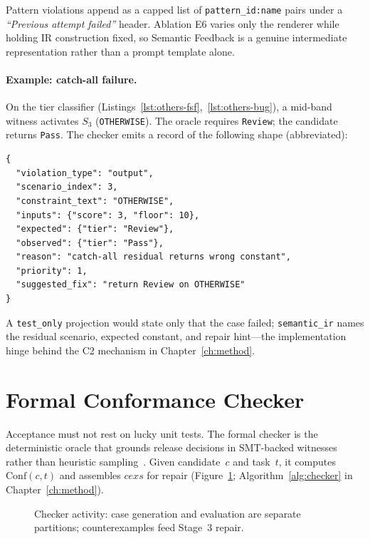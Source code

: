 Pattern violations append as a capped list of \texttt{pattern\_id:name}
pairs under a \emph{``Previous attempt failed''} header.
Ablation E6 varies only the renderer while holding IR construction fixed,
so Semantic Feedback is a genuine intermediate representation rather than a
prompt template alone.

\paragraph{Example: catch-all failure.}
On the tier classifier (Listings~\ref{lst:others-fsf},~\ref{lst:others-bug}),
a mid-band witness activates $S_3$ (\texttt{OTHERWISE}).
The oracle requires \texttt{Review}; the candidate returns \texttt{Pass}.
The checker emits a record of the following shape (abbreviated):
\begin{lstlisting}[language={},basicstyle=\ttfamily\footnotesize,frame=single]
{
  "violation_type": "output",
  "scenario_index": 3,
  "constraint_text": "OTHERWISE",
  "inputs": {"score": 3, "floor": 10},
  "expected": {"tier": "Review"},
  "observed": {"tier": "Pass"},
  "reason": "catch-all residual returns wrong constant",
  "priority": 1,
  "suggested_fix": "return Review on OTHERWISE"
}
\end{lstlisting}
A \texttt{test\_only} projection would state only that the case failed;
\texttt{semantic\_ir} names the residual scenario, expected constant, and
repair hint---the implementation hinge behind the C2 mechanism in
Chapter~\ref{ch:method}.

\section{Formal Conformance Checker}
\label{sec:impl:checker}

Acceptance must not rest on lucky unit tests.
The formal checker is the deterministic oracle that grounds release decisions
in SMT-backed witnesses rather than heuristic
sampling~\citep{claessen2000quickcheck}.
Given candidate~$c$ and task~$t$, it computes $\mathrm{Conf}(c,t)$ and
assembles $\mathit{cexs}$ for repair (Figure~\ref{fig:checker-activity};
Algorithm~\ref{alg:checker} in Chapter~\ref{ch:method}).

\begin{figure}[t]
  \centering
  \caption{Checker activity: case generation and evaluation are separate
           partitions; counterexamples feed Stage~3 repair.}
  \label{fig:checker-activity}
\end{figure}

